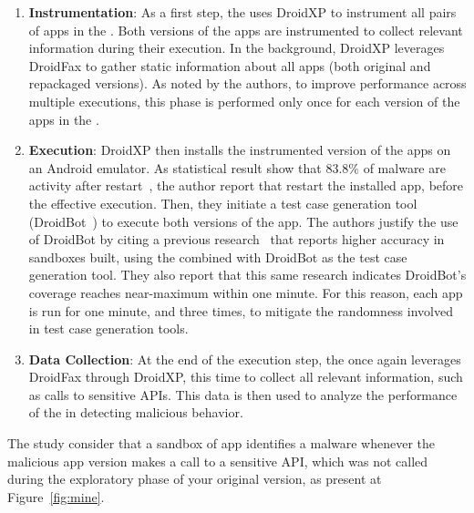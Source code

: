 \begin{enumerate}[1.]
 \item \textbf{Instrumentation}: As a first step, the \fhc uses DroidXP to instrument all pairs of apps in the \cds. Both versions of the apps are instrumented to collect relevant information during their execution. In the background, DroidXP leverages DroidFax to gather static information about all apps (both original and repackaged versions). As noted by the authors, to improve performance across multiple executions, this phase is performed only once for each version of the apps in the \cds.

   
 \item \textbf{Execution}: DroidXP then installs the instrumented version of the apps on an Android emulator. As statistical result show that $83.8\%$ of malware are activity after restart~\cite{DBLP:conf/sp/ZhouJ12}, the author report that restart the installed app, before the effective execution. Then, they initiate a test case generation tool (DroidBot~\cite{DBLP:conf/icse/LiYGC17}) to execute both versions of the app. The authors justify the use of DroidBot by citing a previous research~\cite{DBLP:conf/wcre/BaoLL18} that reports higher accuracy in sandboxes built, using the \mas combined with DroidBot as the test case generation tool. They also report that this same research indicates DroidBot’s coverage reaches near-maximum within one minute. For this reason, each app is run for one minute, and three times, to mitigate the randomness involved in test case generation tools.


\item \textbf{Data Collection}: At the end of the execution step, the \fhc once again leverages DroidFax through DroidXP, this time to collect all relevant information, such as calls to sensitive APIs. This data is then used to analyze the performance of the \mas in detecting malicious behavior.
\end{enumerate}

The study consider that a sandbox of app identifies a malware whenever the malicious app version makes a call to a sensitive API, which was not called during the exploratory phase of your original version, as present at Figure~\ref{fig:mine}.


